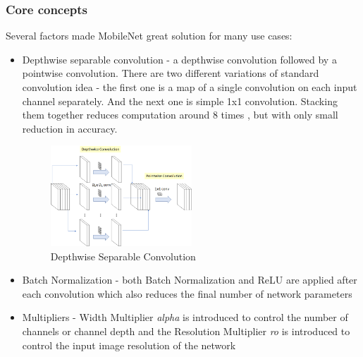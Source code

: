 \documentclass[../Main.tex]{subfiles}
\begin{document}
    \subsubsection{Core concepts}
    Several factors made MobileNet great solution for many use cases:
    \begin{itemize}
        \item Depthwise separable convolution - a depthwise convolution followed by a pointwise convolution. There are two different variations of standard convolution idea - the first one is a map of a single convolution on each input channel separately. And the next one is simple 1x1 convolution. Stacking them together reduces computation around 8 times \cite{MobileNet2017}, but with only small reduction in accuracy.
            \begin{figure}[H]
                \centering
                \includegraphics[width=0.5\textwidth]{Images/02_mobilenet_deepwise.png}
                \caption{Depthwise Separable Convolution \cite{MobileNet2017}}
                \label{fig:mobilenet-dsc}
            \end{figure}
        
        \item Batch Normalization - both Batch Normalization and ReLU are applied after each convolution which also reduces the final number of network parameters
        
        \item Multipliers - Width Multiplier \textit{alpha} is introduced to control the number of channels or channel depth and the Resolution Multiplier \textit{ro} is introduced to control the input image resolution of the network \cite{tds-mobilenet}
    
    \end{itemize}
    
\end{document}
